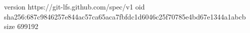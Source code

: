 version https://git-lfs.github.com/spec/v1
oid sha256:687c9846257e844ac57ca65aca7fbfdc1d6046c25f70785e4bd67e1344a1abcb
size 699192
